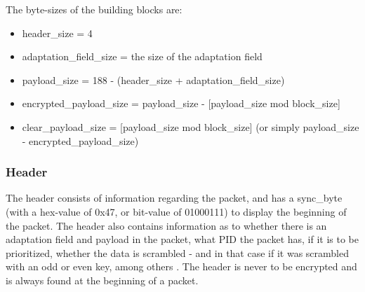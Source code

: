 The byte-sizes of the building blocks are:

\begin{itemize}
\item header\_size = 4
\item adaptation\_field\_size = the size of the adaptation field
\item payload\_size = 188 - (header\_size + adaptation\_field\_size)
\item encrypted\_payload\_size = payload\_size - [payload\_size mod block\_size]
\item clear\_payload\_size = [payload\_size mod block\_size] 
  (or simply payload\_size - encrypted\_payload\_size)
\end{itemize}

\subsubsection{Header}
The header consists of information regarding the packet, and has a sync\_byte 
(with a hex-value of 0x47, or bit-value of 01000111) to display the beginning of 
the packet. The header also contains information as to whether there is an 
adaptation field and payload in the packet, what PID the packet has, if it is to 
be prioritized, whether the data is scrambled - and in that case if it was 
scrambled with an odd or even key, among others \citep[pp. 25--26]{etsiMPEG:2009}
. The header is never to be encrypted and is always found at the beginning of a 
packet. \citep[pp. 10--11]{DVB:2013}


